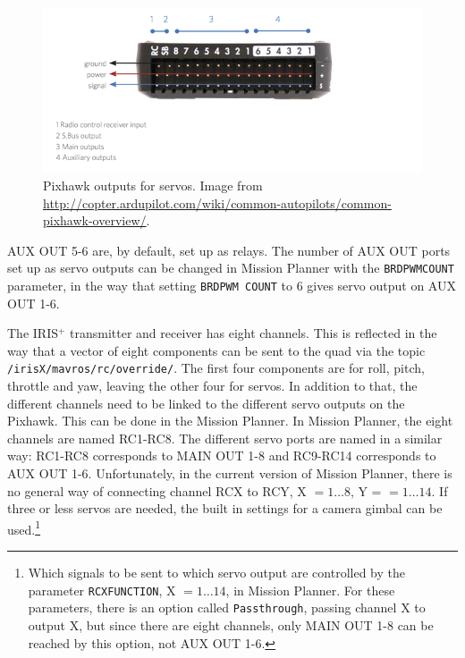 \documentclass[titlepage,11pt,a4paper]{article}
\begin{document}
\begin{figure}[h!]                                                               
  \centering
  \includegraphics[width=1.0\textwidth]{figures/pixhawk_outputs}
  \caption{Pixhawk outputs for servos. Image from
    \url{http://copter.ardupilot.com/wiki/common-autopilots/common-pixhawk-overview/}.}
  \label{fig:pixhawk_outputs}                                                              
\end{figure}

AUX OUT 5-6 are, by default, set up as relays. The number of AUX OUT
ports set up as servo outputs can be changed in Mission Planner with
the \texttt{BRD\textunderscore PWM\textunderscore COUNT} parameter, in
the way that setting \texttt{BRD\textunderscore PWM\textunderscore
 COUNT} to 6 gives servo output on AUX OUT 1-6.

The IRIS$^+$ transmitter and receiver has eight channels. This is
reflected in the way that a vector of eight components can be sent to
the quad via the topic \texttt{/irisX/mavros/rc/override/}. The first four
components are for roll, pitch, throttle and yaw, leaving the other
four for servos. In addition to that, the different channels need to
be linked to the different servo outputs on the Pixhawk. This can
be done in the Mission Planner. In Mission Planner, the eight channels
are named RC1-RC8. The different servo ports are named in a similar
way: RC1-RC8 corresponds to MAIN OUT 1-8 and RC9-RC14 corresponds to
AUX OUT 1-6. Unfortunately, in the current version of Mission Planner,
there is no general way of connecting channel RCX to RCY, X $= 1 \dots
8$, Y = $= 1 \dots 14$. If three or less servos are needed, the built
in settings for a camera gimbal can be used.\footnote{Which signals to
be sent to which servo output are controlled by the parameter
\texttt{RCX\textunderscore FUNCTION}, X $= 1 \dots 14$, in Mission
Planner. For these parameters, there is an option called
\texttt{Passthrough}, passing channel X to output X, but since there
are eight channels, only MAIN OUT 1-8 can be reached by this option,
not AUX OUT 1-6.}
\end{document}
